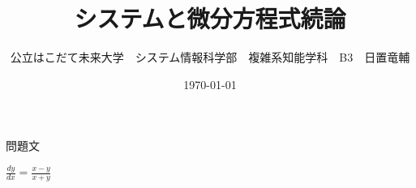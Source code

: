 \documentclass[dvipdfmx,uplatex]{jsarticle}
\title{システムと微分方程式続論}
\author{公立はこだて未来大学　システム情報科学部　複雑系知能学科　B3　日置竜輔}
\date{\today}
\begin{document}
\begin{spacing}{1.6}
\maketitle

問題文
\begin{qparts}
    \qpart $ \displaystyle \frac{dy}{dx} = \frac{x - y}{x + y} $ \\
\end{qparts}
\end{spacing}
\end{document}
